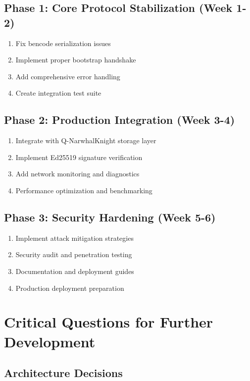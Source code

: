 \documentclass[11pt,a4paper]{article}
\begin{document}
{{{{{{{{{{\subsection{Phase 1: Core Protocol Stabilization (Week 1-2)}
\begin{enumerate}
    \item Fix bencode serialization issues
    \item Implement proper bootstrap handshake
    \item Add comprehensive error handling
    \item Create integration test suite
\end{enumerate}

\subsection{Phase 2: Production Integration (Week 3-4)}
\begin{enumerate}
    \item Integrate with Q-NarwhalKnight storage layer
    \item Implement Ed25519 signature verification
    \item Add network monitoring and diagnostics
    \item Performance optimization and benchmarking
\end{enumerate}

\subsection{Phase 3: Security Hardening (Week 5-6)}
\begin{enumerate}
    \item Implement attack mitigation strategies
    \item Security audit and penetration testing
    \item Documentation and deployment guides
    \item Production deployment preparation
\end{enumerate}

\section{Critical Questions for Further Development}

\subsection{Architecture Decisions}

}}}}}}}}}}
\end{document}
